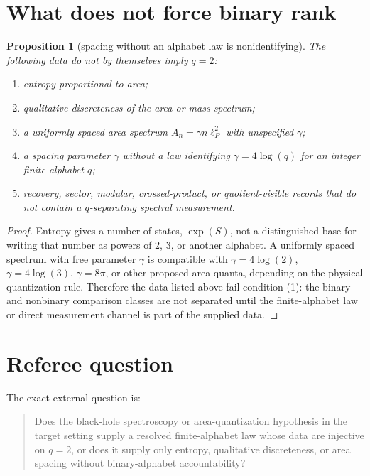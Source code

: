 \documentclass[12pt]{article}
\newtheorem{proposition}{Proposition}
\theoremstyle{remark}
\begin{document}
\section{What does not force binary rank}

\begin{proposition}[spacing without an alphabet law is nonidentifying]
\label{prop:nonidentifying}
The following data do not by themselves imply \(q=2\):
\begin{enumerate}
\item entropy proportional to area;
\item qualitative discreteness of the area or mass spectrum;
\item a uniformly spaced area spectrum \(A_n=\gamma n\ell_P^2\) with
      unspecified \(\gamma\);
\item a spacing parameter \(\gamma\) without a law identifying
      \(\gamma=4\log(q)\) for an integer finite alphabet \(q\);
\item recovery, sector, modular, crossed-product, or quotient-visible records
      that do not contain a \(q\)-separating spectral measurement.
\end{enumerate}
\end{proposition}

\begin{proof}
Entropy gives a number of states, \(\exp(S)\), not a distinguished base for
writing that number as powers of \(2\), \(3\), or another alphabet.  A
uniformly spaced spectrum with free parameter \(\gamma\) is compatible with
\(\gamma=4\log(2)\), \(\gamma=4\log(3)\), \(\gamma=8\pi\), or other proposed
area quanta, depending on the physical quantization rule.  Therefore the data
listed above fail condition (1): the binary and nonbinary comparison classes
are not separated until the finite-alphabet law or direct measurement channel
is part of the supplied data.
\end{proof}

\section{Referee question}

The exact external question is:

\begin{quote}
Does the black-hole spectroscopy or area-quantization hypothesis in the target
setting supply a resolved finite-alphabet law whose data are injective on
\(q=2\), or does it supply only entropy, qualitative discreteness, or area
spacing without binary-alphabet accountability?
\end{quote}
\end{document}
